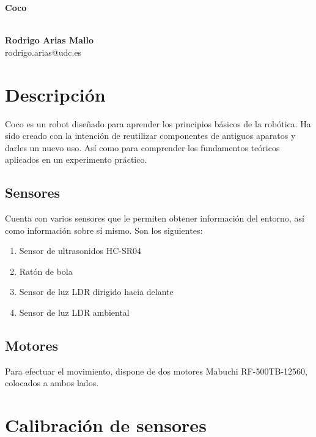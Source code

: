 \documentclass[10pt,a4paper,hidelinks]{article}
\begin{document}
\begin{center}
\begin{huge}
\textbf{Coco}
\end{huge}
\\[10pt]
\textbf{Rodrigo Arias Mallo}\\
rodrigo.arias@udc.es
\end{center}

\newcommand\RobotAngle{45}
\newcommand\RobotSize{2}
\newcommand\RobotRadius{4}
\newcommand\RobotThetaSonar{60.0}

\begin{multicols}{2}

\section{Descripción}
Coco es un robot diseñado para aprender los principios básicos de la robótica.
Ha sido creado con la intención de reutilizar componentes de antiguos aparatos y 
darles un nuevo uso. Así como para comprender los fundamentos teóricos
aplicados en un experimento práctico.

\subsection{Sensores}
Cuenta con varios sensores que le permiten obtener información del entorno, así
como información sobre sí mismo. Son los siguientes:

\begin{enumerate}
	\setlength{\parskip}{0cm}

	\item Sensor de ultrasonidos HC-SR04
	\item Ratón de bola
	\item Sensor de luz LDR dirigido hacia delante
	\item Sensor de luz LDR ambiental
\end{enumerate}

\subsection{Motores}
Para efectuar el movimiento, dispone de dos motores Mabuchi RF-500TB-12560, colocados
a ambos lados.


\section{Calibración de sensores}

\end{multicols}
\end{document}

